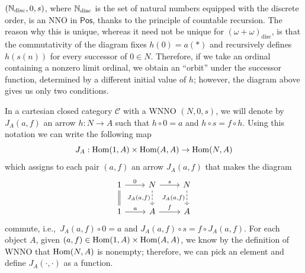 \begin{example}
    $(\mathbb{N}_{\mathrm{disc}}, 0, s)$, where $\mathbb{N}_{\mathrm{disc}}$ is the set of natural numbers equipped with the discrete order, is an NNO in $\textsf{Pos}$, thanks to the principle of countable recursion.
    The reason why this is unique, whereas it need not be unique for $(\omega + \omega)_{\mathrm{disc}}$, is that the commutativity of the diagram fixes $h(0) = a(*)$ and
    recursively defines $h(s(n))$ for every successor of $0 \in N$. Therefore, if we take an ordinal containing a nonzero limit ordinal,
    we obtain an “orbit” under the successor function, determined by a different initial value of $h$; however, the diagram above gives us only two conditions.
\end{example}

\begin{notation}
    In a cartesian closed category $\mathcal{C}$ with a WNNO $(N,0,s)$, we will denote by $J_A(a,f)$ an arrow $h : N \to A$ such that $h \circ 0 = a$ and $h \circ s = f \circ h$.\label{idx:external-iterator}
    Using this notation we can write the following map
    \[ J_A : \operatorname{Hom}(1,A) \times \operatorname{Hom}(A,A) \to \operatorname{Hom}(N,A) \]
    which assigns to each pair $(a,f)$ an arrow $J_A(a,f)$ that makes the diagram
    \[\begin{tikzcd}
        1 & N & N \\
        1 & A & A
        \arrow["0", from=1-1, to=1-2]
        \arrow[shift left=0.20ex, -{}, from=1-1, to=2-1]
        \arrow[shift right=0.20ex, -{}, from=1-1, to=2-1]
        \arrow["s", from=1-2, to=1-3]
        \arrow["{J_A(a,f)}"', dashed, from=1-2, to=2-2]
        \arrow["{J_A(a,f)}"', dashed, from=1-3, to=2-3]
        \arrow["a", from=2-1, to=2-2]
        \arrow["f", from=2-2, to=2-3]
    \end{tikzcd}\]
    commute, i.e.,\ $J_A(a,f) \circ 0 = a$ and $J_A(a,f) \circ s = f \circ J_A(a,f)$. For each object $A$, given $(a,f) \in \operatorname{Hom}(1,A) \times \operatorname{Hom}(A,A)$, we know
        by the definition of WNNO that $\operatorname{Hom}(N,A)$ is nonempty; therefore, we can pick an element and define $J_A(\cdot,\cdot)$ as a function.

\end{notation}
